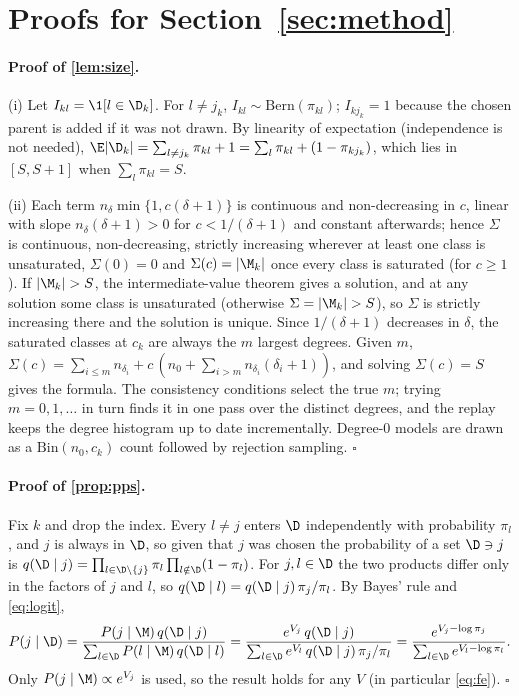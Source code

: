 \section{Proofs for Section~\ref{sec:method}}
\label{app:proofs}

\paragraph{Proof of \cref{lem:size}.}
(i) Let $I_{kl} = \1[l \in \D_k]$. For $l \ne j_k$, $I_{kl} \sim \mathrm{Bern}(\pi_{kl})$; $I_{kj_k} = 1$ because
the chosen parent is added if it was not drawn. By linearity of expectation (independence is not needed),
$\E|\D_k| = \sum_{l \ne j_k} \pi_{kl} + 1 = \sum_{l} \pi_{kl} + (1 - \pi_{kj_k})$, which lies in $[S, S+1]$ when
$\sum_l \pi_{kl} = S$.

(ii) Each term $n_\delta \min\{1, c(\delta+1)\}$ is continuous and non-decreasing in $c$, linear with slope
$n_\delta(\delta+1) > 0$ for $c < 1/(\delta+1)$ and constant afterwards; hence $\Sigma$ is continuous,
non-decreasing, strictly increasing wherever at least one class is unsaturated, $\Sigma(0) = 0$ and $\Sigma(c) =
|\M_k|$ once every class is saturated (for $c \ge 1$). If $|\M_k| > S$, the intermediate-value theorem gives a
solution, and at any solution some class is unsaturated (otherwise $\Sigma = |\M_k| > S$), so $\Sigma$ is strictly
increasing there and the solution is unique. Since $1/(\delta+1)$ decreases in $\delta$, the saturated classes at
$c_k$ are always the $m$ largest degrees. Given $m$, $\Sigma(c) = \sum_{i \le m} n_{\delta_i} + c\,(n_0 + \sum_{i >
m} n_{\delta_i}(\delta_i + 1))$, and solving $\Sigma(c) = S$ gives the formula. The consistency conditions select
the true $m$; trying $m = 0, 1, \dots$ in turn finds it in one pass over the distinct degrees, and the replay keeps
the degree histogram up to date incrementally. Degree-0 models are drawn as a $\mathrm{Bin}(n_0, c_k)$ count followed
by rejection sampling. \hfill$\square$

\paragraph{Proof of \cref{prop:pps}.}
Fix $k$ and drop the index. Every $l \ne j$ enters $\D$ independently with probability $\pi_l$, and $j$ is always in
$\D$, so given that $j$ was chosen the probability of a set $\D \ni j$ is $q(\D \mid j) = \prod_{l \in \D \setminus
\{j\}} \pi_l \prod_{l \notin \D}(1 - \pi_l)$. For $j, l \in \D$ the two products differ only in the factors of $j$
and $l$, so $q(\D \mid l) = q(\D \mid j)\,\pi_j / \pi_l$. By Bayes' rule and \eqref{eq:logit},
\[
  P(j \mid \D) = \frac{P(j \mid \M)\, q(\D \mid j)}{\sum_{l \in \D} P(l \mid \M)\, q(\D \mid l)}
  = \frac{e^{V_j}\, q(\D \mid j)}{\sum_{l \in \D} e^{V_l}\, q(\D \mid j)\, \pi_j / \pi_l}
  = \frac{e^{V_j - \log \pi_j}}{\sum_{l \in \D} e^{V_l - \log \pi_l}}.
\]
Only $P(j \mid \M) \propto e^{V_j}$ is used, so the result holds for any $V$ (in particular \eqref{eq:fe}).
\hfill$\square$

